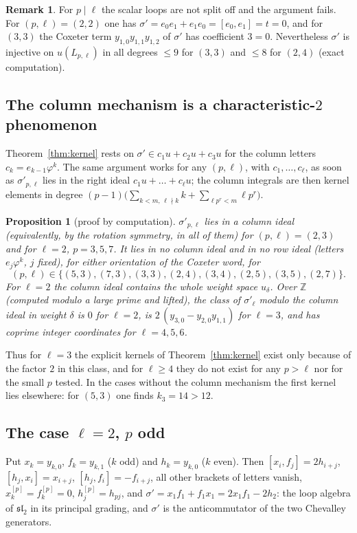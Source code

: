 \documentclass[11pt]{amsart}
\newtheorem{proposition}[theorem]{Proposition}
\theoremstyle{definition}
\newtheorem{remark}[theorem]{Remark}
\newcommand{\Z}{\mathbb{Z}}
\begin{document}
\begin{remark}
For $p\mid\ell$ the scalar loops are not split off and the argument fails. For $(p,\ell)=(2,2)$ one has
$\sigma'=e_0e_1+e_1e_0=[e_0,e_1]=t=0$, and for $(3,3)$ the Coxeter term $y_{1,0}y_{1,1}y_{1,2}$ of $\sigma'$ has coefficient
$3=0$. Nevertheless $\sigma'$ is injective on $u(L_{p,\ell})$ in all degrees $\le9$ for $(3,3)$ and $\le8$ for $(2,4)$
(exact computation).
\end{remark}

\subsection{The column mechanism is a characteristic-$2$ phenomenon}
Theorem~\ref{thm:kernel} rests on $\sigma'\in c_1u+c_2u+c_3u$ for the column letters $c_k=e_{k-1}\varphi^k$. The same
argument works for any $(p,\ell)$, with $c_1,\dots,c_\ell$, as soon as $\sigma'_{p,\ell}$ lies in
the right ideal $c_1u+\dots+c_\ell u$; the column integrals are then kernel elements in degree
$(p-1)\bigl(\sum_{k<m,\,\ell\nmid k}k+\sum_{\ell p^r<m}\ell p^r\bigr)$.

\begin{proposition}[proof by computation]\label{prop:famcol}
$\sigma'_{p,\ell}$ lies in a column ideal (equivalently, by the rotation symmetry, in all of them) for $(p,\ell)=(2,3)$
and for $\ell=2$, $p=3,5,7$. It lies in no column ideal and in no row ideal (letters $e_j\varphi^k$, $j$ fixed), for
either orientation of the Coxeter word, for
\[
  (p,\ell)\in\{(5,3),(7,3),(3,3),(2,4),(3,4),(2,5),(3,5),(2,7)\}.
\]
For $\ell=2$ the
column ideal contains the whole weight space $u_\delta$. Over $\Z$ (computed modulo a large prime and lifted), the class of
$\sigma'_{\ell}$ modulo the column ideal in weight $\delta$ is $0$ for $\ell=2$, is
$2\,(y_{3,0}-y_{2,0}y_{1,1})$ for $\ell=3$, and has coprime integer coordinates for $\ell=4,5,6$.
\end{proposition}

Thus for $\ell=3$ the explicit kernels of Theorem~\ref{thm:kernel} exist only because of the factor $2$ in this class,
and for $\ell\ge4$ they do not exist for any $p>\ell$ nor for the small $p$ tested. In the cases without the column
mechanism the first kernel lies elsewhere: for $(5,3)$ one finds $k_3=14>12$.

\subsection{The case $\ell=2$, $p$ odd}
Put $x_k=y_{k,0}$, $f_k=y_{k,1}$ ($k$ odd) and $h_k=y_{k,0}$ ($k$ even). Then
$[x_i,f_j]=2h_{i+j}$, $[h_j,x_i]=x_{i+j}$, $[h_j,f_i]=-f_{i+j}$, all other brackets of letters vanish,
$x_k^{[p]}=f_k^{[p]}=0$, $h_j^{[p]}=h_{pj}$, and $\sigma'=x_1f_1+f_1x_1=2x_1f_1-2h_2$: the loop algebra of
$\mathfrak{sl}_2$ in its principal grading, and $\sigma'$ is the anticommutator of the two Chevalley generators.
\end{document}
